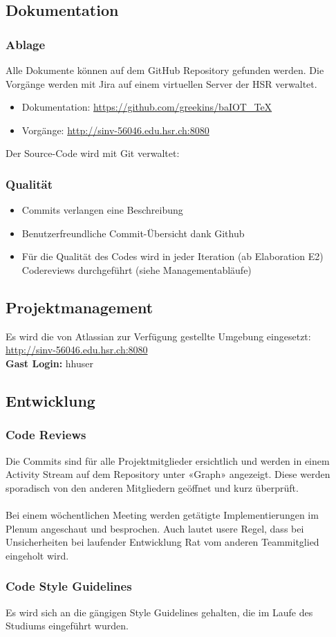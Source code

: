 	\subsection*{Dokumentation}
		\subsubsection*{Ablage}
			Alle Dokumente können auf dem GitHub Repository gefunden werden. Die Vorgänge werden mit Jira auf einem virtuellen Server der HSR verwaltet.
			\begin{itemize}
				\item Dokumentation: \url{https://github.com/greekins/baIOT_TeX} 
				\item Vorgänge: \url{http://sinv-56046.edu.hsr.ch:8080}
			\end{itemize}
			Der Source-Code wird mit Git verwaltet: \tbd

		\subsubsection*{Qualität}
			\begin{itemize}
				\item Commits verlangen eine Beschreibung
				\item Benutzerfreundliche Commit-Übersicht dank Github
				\item Für die Qualität des Codes wird in jeder Iteration (ab Elaboration E2) Codereviews durchgeführt (siehe Managementabläufe)
			\end{itemize}

	\subsection*{Projektmanagement}
		Es wird die von Atlassian zur Verfügung gestellte Umgebung eingesetzt: \\
		\url{http://sinv-56046.edu.hsr.ch:8080} \\
		\textbf{Gast Login:} hhuser


	\subsection*{Entwicklung}
		\subsubsection*{Code Reviews}
			Die Commits sind für alle Projektmitglieder ersichtlich und werden in einem Activity Stream auf dem Repository unter 
			«Graph» angezeigt. Diese werden sporadisch von den anderen Mitgliedern geöffnet und kurz überprüft. \\
			\\
			Bei einem wöchentlichen Meeting werden getätigte Implementierungen im Plenum angeschaut und besprochen. Auch lautet usere 
			Regel, dass bei Unsicherheiten bei laufender Entwicklung Rat vom anderen Teammitglied eingeholt wird.

		\subsubsection*{Code Style Guidelines}
			Es wird sich an die gängigen Style Guidelines gehalten, die im Laufe des Studiums eingeführt wurden.